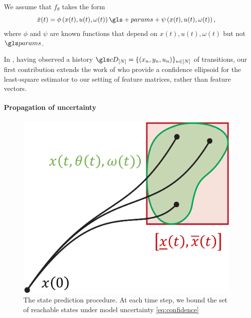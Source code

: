 \begin{assumption}
	\begin{leftbar}[assumptionbar]
	We assume that $f_\theta$ takes the form
	\begin{equation*}
	\dot{x}(t) = \phi\left(x(t),u(t),\omega(t)\right)\gls+{params} + \psi\left(x(t),u(t),\omega(t)\right),
	\end{equation*}
	where $\phi$ and $\psi$ are known functions that depend on $x(t),u(t),\omega(t)$ but not $\params$.
	\end{leftbar}
\end{assumption}

In \textbf{}, having observed a history $\cD_{[N]} = \{(x_n, y_n,u_n)\}_{n\in[N]}$ of transitions, our first contribution extends the work of \citet{Abbasi2011} who provide a confidence ellipsoid for the least-square estimator to our setting of feature matrices, rather than feature vectors.

\paragraph{Propagation of uncertainty}

\begin{figure}[ht]
	\centering
	\includegraphics[trim={0 0 0 0}, clip, width=0.5\linewidth]{img/interval-hull}
	\caption{The state prediction procedure. At each time step, we bound  the set of reachable states  under model uncertainty \eqref{eq:confidence}}
	\label{fig:prediction}
\end{figure}


